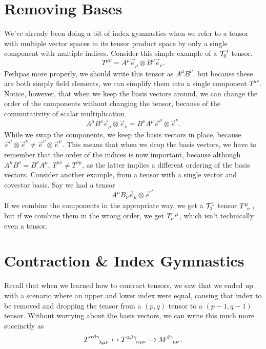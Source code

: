 \section{Removing Bases}
We've already been doing a bit of index gymnastics when we refer to a tensor with multiple vector spaces in its tensor product space by only a single component with multiple indices.
Consider this simple example of a $\mathcal{T}^2_0$ tensor,
\[ T^{\mu\nu} = A^\mu \vec{e}_\mu \otimes B^\nu \vec{e}_\nu. \]
Perhpas more properly, we should write this tensor as $A^\mu B^\nu$, but because these are both simply field elements, we can simplify them into a single component $T^{\mu\nu}$.
Notice, however, that when we keep the basis vectors around, we can change the order of the components without changing the tensor, because of the commutativity of scalar multiplication.
\[ A^\mu B^\nu \vec{e}_\mu \otimes \vec{e}_\nu = B^\nu A^\mu \vec{e}^\mu \otimes \vec{e}^\nu. \]
While we swap the components, we keep the basis vectors in place, because $\vec{e}^\mu \otimes \vec{e}^\nu \not= \vec{e}^\nu \otimes \vec{e}^\mu$.
This means that when we drop the basis vectors, we have to remember that the order of the indices is now important, because although $A^\mu B^\nu = B^\nu A^\mu$, $T^{\mu\nu} \not= T^{\nu\mu}$, as the latter implies a different ordering of the basis vectors.
Consider another example, from a tensor with a single vector and covector basis.
Say we had a tensor
\[ A^\mu B_\nu \vec{e}_\mu \otimes \vec{e}^\nu. \]
If we combine the components in the appropriate way, we get a $\mathcal{T}^1_1$ tensor $\tensor{T}{^\mu_\nu}$, but if we combine them in the wrong order, we get $\tensor{T}{_\nu^\mu}$, which isn't technically even a tensor.

\section{Contraction \& Index Gymnastics}
Recall that when we learned how to contract tensors, we saw that we ended up with a scenario where an upper and lower index were equal, causing that index to be removed and dropping the tensor from a $(p,q)$ tensor to a $(p-1,q-1)$ tensor.
Without worrying about the basis vectors, we can write this much more succinctly as
\[ \tensor{T}{^{\alpha\beta\gamma}_{\lambda\mu\nu}} \mapsto \tensor{T}{^{\alpha\beta\gamma}_{\alpha\mu\nu}} \mapsto \tensor{M}{^{\beta\gamma}_{\mu\nu}}. \]

